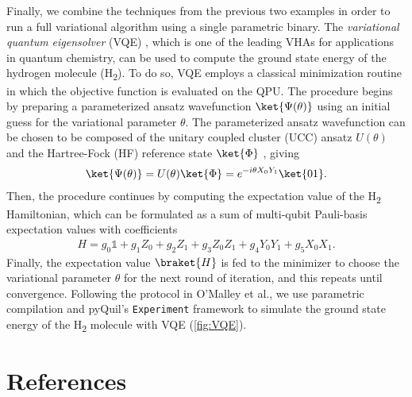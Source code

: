 \documentclass[12pt]{iopart}
\begin{document}
Finally, we combine the techniques from the previous two examples in order to run a full variational algorithm using a single parametric binary. The \textit{variational quantum eigensolver} (VQE) \cite{PeruzzoPhotonicVQE}, which is one of the leading VHAs for applications in quantum chemistry, can be used to compute the ground state energy of the hydrogen molecule (H\textsubscript{2}). To do so, VQE employs a classical minimization routine in which the objective function is evaluated on the QPU. The procedure begins by preparing a parameterized ansatz wavefunction $\ket{\Psi(\theta)}$ using an initial guess for the variational parameter $\theta$. The parameterized ansatz wavefunction can be chosen to be composed of the unitary coupled cluster (UCC) ansatz $U(\theta)$ and the Hartree-Fock (HF) reference state $\ket{\Phi}$ \cite{GoogleXmonVQE}, giving
\begin{align}
    \ket{\Psi(\theta)} = U(\theta)\ket{\Phi} = e^{-i \theta X_0 Y_1}\ket{01}.
\label{eq:Ansatz}
\end{align}
Then, the procedure continues by computing the expectation value of the H\textsubscript{2} Hamiltonian, which can be formulated as a sum of multi-qubit Pauli-basis expectation values with coefficients
\begin{align}
    H = g_0 \mathbb{1} + g_1 Z_0 + g_2 Z_1 + g_3 Z_0 Z_1 + g_4 Y_0 Y_1 + g_5 X_0 X_1.
\label{eq:Hamiltonian}
\end{align}
Finally, the expectation value $\braket{H}$ is fed to the minimizer to choose the variational parameter $\theta$ for the next round of iteration, and this repeats until convergence. Following the protocol in O'Malley et al., we use parametric compilation and pyQuil's \texttt{Experiment} framework to simulate the ground state energy of the H\textsubscript{2} molecule with VQE (\cref{fig:VQE}).

\section*{References}


\end{document}
